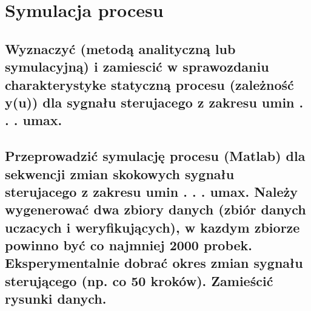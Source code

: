 \chapter{Symulacja procesu}


\section{Wyznaczyć (metodą analityczną lub symulacyjną) i zamiescić w sprawozdaniu charakterystyke statyczną procesu (zależność y(u)) dla sygnału sterujacego z zakresu umin . . . umax.}


\section{Przeprowadzić symulację procesu (Matlab) dla sekwencji zmian skokowych sygnału sterujacego z zakresu umin . . . umax. Należy wygenerować dwa zbiory danych (zbiór danych uczacych i weryfikujących), w kazdym zbiorze powinno być co najmniej 2000 probek. Eksperymentalnie	dobrać okres zmian sygnału sterującego (np. co 50 kroków). Zamieścić rysunki danych.}


